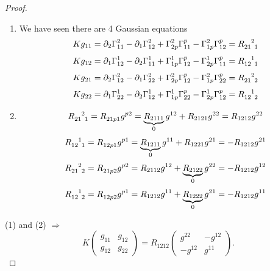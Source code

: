 \begin{proof}
    \begin{enumerate}[(1)]
        \item We have seen there are 4 Gaussian equations
        \[
            K g_{11}=\partial_2\Gamma\indices*{_{11}^2}
            -\partial_1\Gamma\indices*{_{12}^2}
            +\Gamma\indices*{_{2p}^2}\Gamma\indices*{_{11}^p}
            -\Gamma\indices*{_{1p}^2}\Gamma\indices*{_{12}^p}
            =\tensor{R}{_{21}^2_1}
        \]
        \[
            K g_{12}=\partial_1\Gamma\indices*{_{12}^1}
            -\partial_2\Gamma\indices*{_{11}^1}
            +\Gamma\indices*{_{1p}^1}\Gamma\indices*{_{12}^p}
            -\Gamma\indices*{_{2p}^1}\Gamma\indices*{_{11}^p}
            =\tensor{R}{_{12}^1_1}
        \]
        \[
            K g_{21}=\partial_2\Gamma\indices*{_{12}^2}
            -\partial_1\Gamma\indices*{_{22}^2}
            +\Gamma\indices*{_{2p}^2}\Gamma\indices*{_{12}^p}
            -\Gamma\indices*{_{1p}^2}\Gamma\indices*{_{22}^p}
            =\tensor{R}{_{21}^2_2}
        \]
        \[
            K g_{22}=\partial_1\Gamma\indices*{_{22}^1}
            -\partial_2\Gamma\indices*{_{12}^1}
            +\Gamma\indices*{_{1p}^1}\Gamma\indices*{_{22}^p}
            -\Gamma\indices*{_{2p}^1}\Gamma\indices*{_{12}^p}
            =\tensor{R}{_{12}^1_2}    
        \]
        \item \[
            \tensor{R}{_{21}^2_1}=\tensor{R}{_{21p1}}g^{p2}
            =\underbrace{R_{2111}}_{0}g^{12}+R_{2121}g^{22}=R_{1212}g^{22}
        \]
        \[
            \tensor{R}{_{12}^1_1}=\tensor{R}{_{12p1}}g^{p1}
            =\underbrace{R_{1211}}_{0}g^{11}+R_{1221}g^{21}=-R_{1212}g^{21}
        \]
        \[
            \tensor{R}{_{21}^2_2}=\tensor{R}{_{21p2}}g^{p2}
            =R_{2112}g^{12}+\underbrace{R_{2122}}_{0}g^{22}
            =-R_{1212}g^{12}
        \]
        \[
            \tensor{R}{_{12}^1_2}=\tensor{R}{_{12p2}}g^{p1}
            =R_{1212}g^{11}+\underbrace{R_{1222}}_{0}g^{21}
            =-R_{1212}g^{11}
        \]
    \end{enumerate}
    (1) and (2) \(\Rightarrow\)
    \[
        K\begin{pmatrix}
            g_{11}& g_{12}\\
            g_{12} & g_{22}
        \end{pmatrix}    
        =
        R_{1212}\begin{pmatrix}
            g^{22} & -g^{12}\\
            -g^{12} & g^{11} 
        \end{pmatrix}.
\]
\end{proof}
